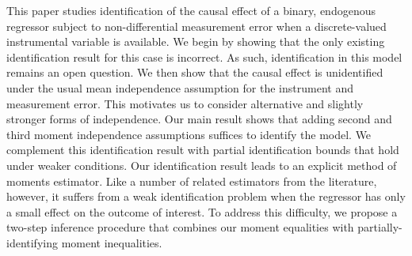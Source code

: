 This paper studies identification of the causal effect of a binary, endogenous regressor subject to non-differential measurement error when a discrete-valued instrumental variable is available. 
We begin by showing that the only existing identification result for this case is incorrect.
As such, identification in this model remains an open question.
We then show that the causal effect is unidentified under the usual mean independence assumption for the instrument and measurement error.
This motivates us to consider alternative and slightly stronger forms of independence.
Our main result shows that adding second and third moment independence assumptions suffices to identify the model.
We complement this identification result with partial identification bounds that hold under weaker conditions.
Our identification result leads to an explicit method of moments estimator. 
Like a number of related estimators from the literature, however, it suffers from a weak identification problem when the regressor has only a small effect on the outcome of interest. 
To address this difficulty, we propose a two-step inference procedure that combines our moment equalities with partially-identifying moment inequalities.
